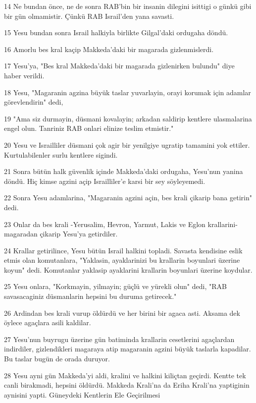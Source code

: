 \par 14 Ne bundan önce, ne de sonra RAB'bin bir insanin dilegini isittigi o günkü gibi bir gün olmamistir. Çünkü RAB Israil'den yana savasti.
\par 15 Yesu bundan sonra Israil halkiyla birlikte Gilgal'daki ordugaha döndü.
\par 16 Amorlu bes kral kaçip Makkeda'daki bir magarada gizlenmislerdi.
\par 17 Yesu'ya, "Bes kral Makkeda'daki bir magarada gizlenirken bulundu" diye haber verildi.
\par 18 Yesu, "Magaranin agzina büyük taslar yuvarlayin, orayi korumak için adamlar görevlendirin" dedi,
\par 19 "Ama siz durmayin, düsmani kovalayin; arkadan saldirip kentlere ulasmalarina engel olun. Tanriniz RAB onlari elinize teslim etmistir."
\par 20 Yesu ve Israilliler düsmani çok agir bir yenilgiye ugratip tamamini yok ettiler. Kurtulabilenler surlu kentlere sigindi.
\par 21 Sonra bütün halk güvenlik içinde Makkeda'daki ordugaha, Yesu'nun yanina döndü. Hiç kimse agzini açip Israilliler'e karsi bir sey söyleyemedi.
\par 22 Sonra Yesu adamlarina, "Magaranin agzini açin, bes krali çikarip bana getirin" dedi.
\par 23 Onlar da bes krali -Yerusalim, Hevron, Yarmut, Lakis ve Eglon krallarini- magaradan çikarip Yesu'ya getirdiler.
\par 24 Krallar getirilince, Yesu bütün Israil halkini topladi. Savasta kendisine eslik etmis olan komutanlara, "Yaklasin, ayaklarinizi bu krallarin boyunlari üzerine koyun" dedi. Komutanlar yaklasip ayaklarini krallarin boyunlari üzerine koydular.
\par 25 Yesu onlara, "Korkmayin, yilmayin; güçlü ve yürekli olun" dedi, "RAB savasacaginiz düsmanlarin hepsini bu duruma getirecek."
\par 26 Ardindan bes krali vurup öldürdü ve her birini bir agaca asti. Aksama dek öylece agaçlara asili kaldilar.
\par 27 Yesu'nun buyrugu üzerine gün batiminda krallarin cesetlerini agaçlardan indirdiler, gizlendikleri magaraya atip magaranin agzini büyük taslarla kapadilar. Bu taslar bugün de orada duruyor.
\par 28 Yesu ayni gün Makkeda'yi aldi, kralini ve halkini kiliçtan geçirdi. Kentte tek canli birakmadi, hepsini öldürdü. Makkeda Krali'na da Eriha Krali'na yaptiginin aynisini yapti. Güneydeki Kentlerin Ele Geçirilmesi
